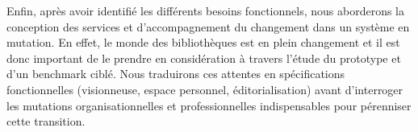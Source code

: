 Enfin, après avoir identifié les différents besoins fonctionnels, nous aborderons la conception des services et d’accompagnement du changement dans un système en mutation. En effet, le monde des bibliothèques est en plein changement et il est donc important de le prendre en considération à travers l’étude du prototype et d'un benchmark ciblé. Nous traduirons ces attentes en spécifications fonctionnelles (visionneuse, espace personnel, éditorialisation) avant d’interroger les mutations organisationnelles et professionnelles indispensables pour pérenniser cette transition.